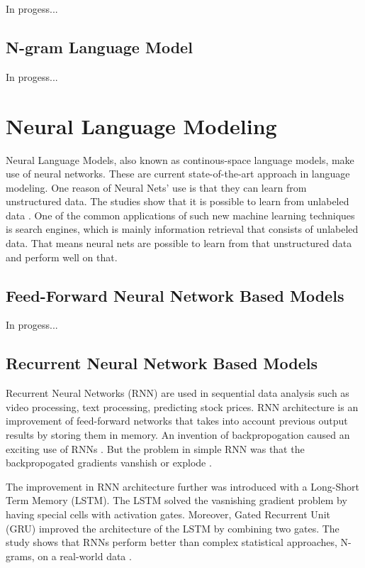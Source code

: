 \documentclass{IEEEtran}
\begin{document}
In progess...

\subsection{N-gram Language Model}

In progess...

\section{Neural Language Modeling}

Neural Language Models, also known as continous-space language models, make use of neural networks. These are current state-of-the-art approach in language modeling. One reason of Neural Nets' use is that they can learn from unstructured data. The studies show that it is possible to learn from unlabeled data \cite{unsupervised}. One of the common applications of such new machine learning techniques is search engines, which is mainly information retrieval that consists of unlabeled data. That means neural nets are possible to learn from that unstructured data and perform well on that.

\subsection{Feed-Forward Neural Network Based Models}

In progess...

\subsection{Recurrent Neural Network Based Models}

Recurrent Neural Networks (RNN) are used in sequential data analysis such as video processing, text processing, predicting stock prices. RNN architecture is an improvement of feed-forward networks that takes into account previous output results by storing them in memory. An invention of backpropogation caused an exciting use of RNNs \cite{deeplearning}. But the problem in simple RNN was that the backpropogated gradients vanshish or explode \cite{deeplearning}.

The improvement in RNN architecture further was introduced with a Long-Short Term Memory (LSTM). The LSTM solved the vasnishing gradient problem by having special cells with activation gates. Moreover, Gated Recurrent Unit (GRU) improved the architecture of the LSTM by combining two gates. The study shows that RNNs perform better than complex statistical approaches, N-grams, on a real-world data \cite{rnn}.
\end{document}
